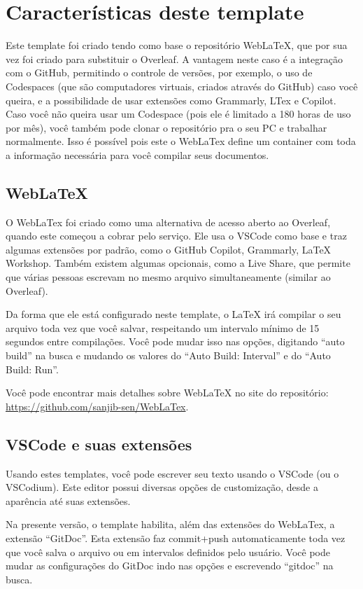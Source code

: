   \section{Características deste template}
    Este template foi criado tendo como base o repositório Web\LaTeX{}, que por sua vez foi criado para substituir o Overleaf. A vantagem neste caso é a integração com o GitHub, permitindo o controle de versões, por exemplo, o uso de Codespaces (que são computadores virtuais, criados através do GitHub) caso você queira, e a possibilidade de usar extensões como Grammarly, LTex e Copilot. Caso você não queira usar um Codespace (pois ele é limitado a 180 horas de uso por mês), você também pode clonar o repositório pra o seu PC e trabalhar normalmente. Isso é possível pois este o WebLaTex define um container com toda a informação necessária para você compilar seus documentos.

    \subsection{Web\LaTeX{}}
      O WebLaTex foi criado como uma alternativa de acesso aberto ao Overleaf, quando este começou a cobrar pelo serviço. Ele usa o VSCode como base e traz algumas extensões por padrão, como o GitHub Copilot, Grammarly, \LaTeX{} Workshop. Também existem algumas opcionais, como a Live Share, que permite que várias pessoas escrevam no mesmo arquivo simultaneamente (similar ao Overleaf).

      Da forma que ele está configurado neste template, o \LaTeX{} irá compilar o seu arquivo toda vez que você salvar, respeitando um intervalo mínimo de 15 segundos entre compilações. Você pode mudar isso nas opções, digitando ``auto build'' na busca e mudando os valores do ``Auto Build: Interval'' e do ``Auto Build: Run''.

      Você pode encontrar mais detalhes sobre Web\LaTeX{} no site do repositório: \url{https://github.com/sanjib-sen/WebLaTex}.

    \subsection{VSCode e suas extensões}
      Usando estes templates, você pode escrever seu texto usando o VSCode (ou o VSCodium). Este editor possui diversas opções de customização, desde a aparência até suas extensões.

      Na presente versão, o template habilita, além das extensões do WebLaTex, a extensão ``GitDoc''. Esta extensão faz commit+push automaticamente toda vez que você salva o arquivo ou em intervalos definidos pelo usuário. Você pode mudar as configurações do GitDoc indo nas opções e escrevendo ``gitdoc'' na busca.

